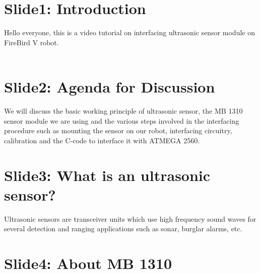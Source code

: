 \documentclass[a4paper,29.6pt]{article}
\begin{document}
\newpage
\section{Slide1: Introduction}
\begin{small}
Hello everyone, this is a video tutorial on interfacing ultrasonic sensor module on FireBird V robot.\\\\

\end{small}

\section{Slide2: Agenda for Discussion}
\begin{small}

We will discuss the basic working principle of ultrasonic sensor, the MB 1310 sensor module we are using and the various steps involved in the interfacing procedure such as mounting the sensor on our robot, interfacing circuitry, calibration and the C-code to interface it with ATMEGA 2560.

\end{small}

\section{Slide3: What is an ultrasonic sensor? }
\begin{small}
Ultrasonic sensors are transceiver units which use high frequency sound waves for several detection and ranging applications such as sonar, burglar alarms, etc.
\end{small}

\section{Slide4: About MB 1310}
\end{document}

